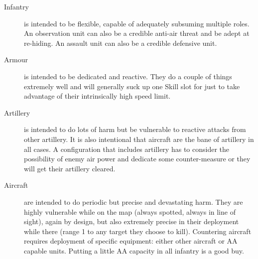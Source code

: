 \begin{description}
\item[Infantry]
is intended to be flexible, capable of adequately subsuming multiple roles. An observation unit can also be a credible anti-air threat and be adept at re-hiding. An assault unit can also be a credible defensive unit.

\item[Armour]
is intended to be dedicated and reactive. They do a couple of things extremely well and will generally suck up one Skill slot for  just to take advantage of their intrinsically high speed limit.

\item[Artillery]
is intended to do lots of harm but be vulnerable to reactive attacks from other artillery. It is also intentional that aircraft are the bane of artillery in all cases. A configuration that includes artillery has to consider the possibility of enemy air power and dedicate some counter-measure or they will get their artillery cleared.

\item[Aircraft]
are intended to do periodic but precise and devastating harm. They are highly vulnerable while on the map (always spotted, always in line of sight), again by design, but also extremely precise in their deployment while there (range 1 to any target they choose to kill). Countering aircraft requires deployment of specific equipment: either other aircraft or AA capable units. Putting a little AA capacity in all infantry is a good buy.
\end{description}

